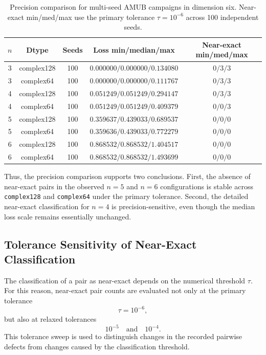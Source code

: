 \documentclass[a4paper,twocolumn,11pt,amsfonts,amssymb]{quantumarticle}
\begin{document}
\begin{table}[t]
  \caption{Precision comparison for multi-seed AMUB campaigns in dimension six. Near-exact min/med/max use the primary tolerance $\tau = 10^{-6}$ across 100 independent seeds.}
  \label{tab:precision-comparison}
  \begin{tabular}{ccccc}
    \toprule
    $n$ & Dtype & Seeds & Loss min/median/max & Near-exact min/med/max \\
    \midrule
    3 & complex128 & 100 & $0.000000/0.000000/0.134080$ & $0 / 3 / 3$ \\
    3 & complex64  & 100 & $0.000000/0.000000/0.111767$ & $0 / 3 / 3$ \\
    4 & complex128 & 100 & $0.051249/0.051249/0.294147$ & $0 / 3 / 3$ \\
    4 & complex64  & 100 & $0.051249/0.051249/0.409379$ & $0 / 0 / 3$ \\
    5 & complex128 & 100 & $0.359637/0.439033/0.689537$ & $0 / 0 / 0$ \\
    5 & complex64  & 100 & $0.359636/0.439033/0.772279$ & $0 / 0 / 0$ \\
    6 & complex128 & 100 & $0.868532/0.868532/1.404517$ & $0 / 0 / 0$ \\
    6 & complex64  & 100 & $0.868532/0.868532/1.493699$ & $0 / 0 / 0$ \\
    \bottomrule
  \end{tabular}
\end{table}
Thus, the precision comparison supports two conclusions. First, the absence of near-exact pairs in the observed \(n=5\) and \(n=6\) configurations is stable across \texttt{complex128} and \texttt{complex64} under the primary tolerance. Second, the detailed near-exact classification for \(n=4\) is precision-sensitive, even though the median loss scale remains essentially unchanged.

\subsection{Tolerance Sensitivity of Near-Exact Classification}
\label{subsec:tolerance-sensitivity}

The classification of a pair as near-exact depends on the numerical threshold \(\tau\). For this reason, near-exact pair counts are evaluated not only at the primary tolerance
\[
\tau = 10^{-6},
\]
but also at relaxed tolerances
\[
10^{-5}
\quad\text{and}\quad
10^{-4}.
\]
This tolerance sweep is used to distinguish changes in the recorded pairwise defects from changes caused by the classification threshold.
\end{document}
